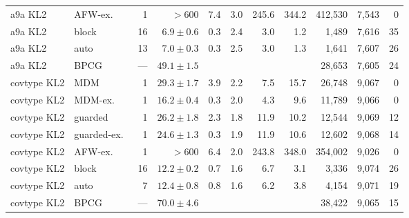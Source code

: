 \begin{table}[htbp]
\begin{tabular}{llrrrrrrrrr}
a9a KL2 & AFW-ex.\ & 1 & $>600$ & 7.4 & 3.0 & 245.6 & 344.2 & 412,530 & 7,543 & 0 \\
a9a KL2 & block & 16 & $6.9\pm0.6$ & 0.3 & 2.4 & 3.0 & 1.2 & 1,489 & 7,616 & 35 \\
a9a KL2 & auto & 13 & $7.0\pm0.3$ & 0.3 & 2.5 & 3.0 & 1.3 & 1,641 & 7,607 & 26 \\
a9a KL2 & BPCG & --- & $49.1\pm1.5$ &  & & & & 28,653 & 7,605 & 24 \\
\midrule
covtype KL2 & MDM & 1 & $29.3\pm1.7$ & 3.9 & 2.2 & 7.5 & 15.7 & 26,748 & 9,067 & 0 \\
covtype KL2 & MDM-ex.\ & 1 & $16.2\pm0.4$ & 0.3 & 2.0 & 4.3 & 9.6 & 11,789 & 9,066 & 0 \\
covtype KL2 & guarded & 1 & $26.2\pm1.8$ & 2.3 & 1.8 & 11.9 & 10.2 & 12,544 & 9,069 & 12 \\
covtype KL2 & guarded-ex.\ & 1 & $24.6\pm1.3$ & 0.3 & 1.9 & 11.9 & 10.6 & 12,602 & 9,068 & 14 \\
covtype KL2 & AFW-ex.\ & 1 & $>600$ & 6.4 & 2.0 & 243.8 & 348.0 & 354,002 & 9,026 & 0 \\
covtype KL2 & block & 16 & $12.2\pm0.2$ & 0.7 & 1.6 & 6.7 & 3.1 & 3,336 & 9,074 & 26 \\
covtype KL2 & auto & 7 & $12.4\pm0.8$ & 0.8 & 1.6 & 6.2 & 3.8 & 4,154 & 9,071 & 19 \\
covtype KL2 & BPCG & --- & $70.0\pm4.6$ &  & & & & 38,422 & 9,065 & 15 \\
\bottomrule\end{tabular}\end{table}

